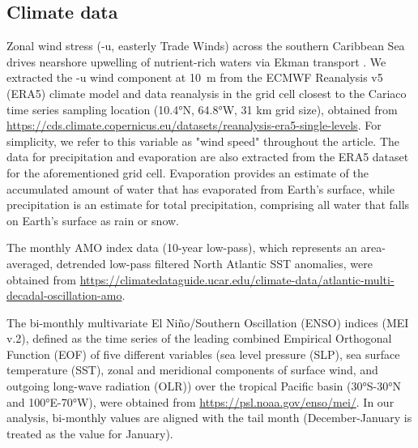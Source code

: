 \documentclass[draft]{agujournal2019}
\begin{document}
\subsection{Climate data}
    Zonal wind stress (-u, easterly Trade Winds) across the southern Caribbean Sea drives nearshore upwelling of nutrient-rich waters via Ekman transport \cite{rueda-roa_southern_2013}. We extracted the -u wind component at \qty{10}{\meter} from the ECMWF Reanalysis v5 (ERA5) climate model and data reanalysis in the grid cell closest to the Cariaco time series sampling location (\ang{10.4}N, \ang{64.8}W, 31 km grid size), obtained from \url{https://cds.climate.copernicus.eu/datasets/reanalysis-era5-single-levels}. For simplicity, we refer to this variable as "wind speed" throughout the article. The data for precipitation and evaporation are also extracted from the ERA5 dataset for the aforementioned grid cell. Evaporation provides an estimate of the accumulated amount of water that has evaporated from Earth's surface, while precipitation is an estimate for total precipitation, comprising all water that falls on Earth's surface as rain or snow. 
    
    The monthly AMO index data (10-year low-pass), which represents an area-averaged, detrended low-pass filtered North Atlantic SST anomalies, were obtained from \url{https://climatedataguide.ucar.edu/climate-data/atlantic-multi-decadal-oscillation-amo}. 
    
    The bi-monthly multivariate El Niño/Southern Oscillation (ENSO) indices (MEI v.2), defined as the time series of the leading combined Empirical Orthogonal Function (EOF) of five different variables (sea level pressure (SLP), sea surface temperature (SST), zonal and meridional components of surface wind, and outgoing long-wave radiation (OLR)) over the tropical Pacific basin (\ang{30}S-\ang{30}N and \ang{100}E-\ang{70}W), were obtained from \url{https://psl.noaa.gov/enso/mei/}. In our analysis, bi-monthly values are aligned with the tail month (December-January is treated as the value for January).
    
\end{document}
